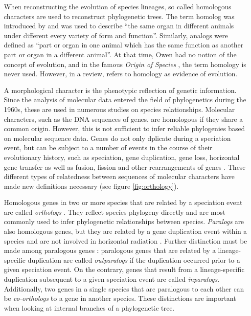 When reconstructing the evolution of species lineages, so called homologous
characters are used to reconstruct phylogenetic trees. The term homolog was
introduced by \citet{owen1848} and was used to describe ``the same organ in
different animals under different every variety of form and function''.
Similarly, analogs were defined as ``part or organ in one animal which has the
same function as another part or organ in a different animal''. At that time,
Owen had no notion of the concept of evolution, and in the famous \emph{Origin
of Species} \citep{darwin1859}, the term homology is never used. However, in a
review, \citet{owen1860} refers to homology as evidence of evolution.

A morphological character is the phenotypic reflection of genetic information.
Since the analysis of molecular data entered the field of phylogenetics during
the 1960s, these are used in numerous studies on species relationships.
Molecular characters, such as the DNA sequences of genes, are homologous if they
share a common origin. However, this is not sufficient to infer reliable
phylogenies based on molecular sequence data. Genes do not only dplicate during
a speciation event, but can be subject to a number of events in the course of
their evolutionary history, such as speciation, gene duplication, gene loss,
horizontal gene transfer as well as fusion, fission and other rearrangements of
genes \citep{koonin2005}.  These different types of relatedness between
sequences of molecular characters have made new definitions necessary (see
figure \ref{fig:orthology}).



Homologous genes in two or more species that are related by a speciation event
are called \emph{orthologs} \citep{fitch1970}. They reflect species phylogeny
directly and are most commonly used to infer phylogenetic relationships between
species. \emph{Paralogs} are also homologous genes, but they are related by a
gene duplication event within a species and are not involved in horizontal
radiation \citep{ohno1970}. Further distinction must be made among paralogous
genes \citep{sonnhammer2002}: paralogous genes that are related by a
lineage-specific duplication are called \emph{outparalogs} if the duplication
occurred prior to a given speciation event. On the contrary, genes that result
from a lineage-specific duplication subsequent to a given speciation event are
called \emph{inparalogs}. Additionally, two genes in a single species that are
paralogous to each other can be \emph{co-orthologs} to a gene in another
species. These distinctions are important when looking at internal branches of a
phylogenetic tree. 

